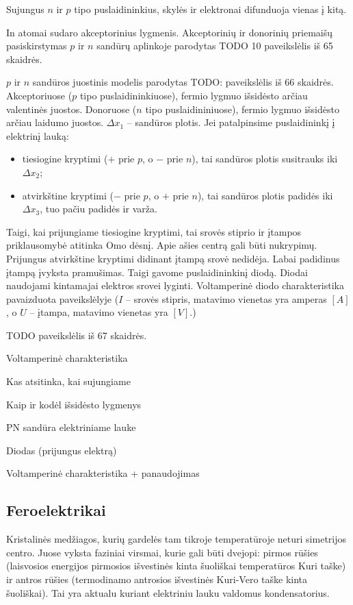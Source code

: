 Sujungus $n$ ir $p$ tipo puslaidininkius, skylės ir elektronai
difunduoja vienas į kitą.

In atomai sudaro akceptorinius lygmenis. Akceptorinių ir donorinių
priemaišų pasiskirstymas $p$ ir $n$ sandūrų aplinkoje
parodytas TODO 10 paveikslėlis iš 65 skaidrės.

$p$ ir $n$ sandūros juostinis modelis parodytas TODO: paveikslėlis
iš 66 skaidrės.
Akceptoriuose ($p$ tipo puslaidininkiuose), fermio lygmuo išsidėsto
arčiau valentinės juostos. Donoruose ($n$ tipo puslaidininiuose),
fermio lygmuo išsidėsto arčiau laidumo juostos. $\Delta x_{1}$ –
sandūros plotis. Jei patalpinsime puslaidininkį į elektrinį
lauką:
\begin{itemize}
  \item tiesiogine kryptimi ($+$ prie $p$, o $-$ prie $n$), tai
    sandūros plotis susitrauks iki $\Delta x_{2}$;
  \item atvirkštine kryptimi ($-$ prie $p$, o $+$ prie $n$),
    tai sandūros plotis padidės iki $\Delta x_{3}$, tuo pačiu
    padidės ir varža.
\end{itemize}
Taigi, kai prijungiame tiesiogine kryptimi, tai srovės stiprio ir
įtampos priklausomybė atitinka Omo dėsnį. Apie ašies centrą gali
būti nukrypimų. Prijungus atvirkštine kryptimi didinant įtampą
srovė nedidėja. Labai padidinus įtampą įvyksta pramušimas.
Taigi gavome puslaidininkinį diodą. Diodai naudojami kintamajai
elektros srovei lyginti. Voltamperinė diodo charakteristika
pavaizduota  paveikslėlyje ($I$ – srovės stipris,
matavimo vienetas yra amperas $[A]$, o $U$ – įtampa, matavimo vienetas
yra $[V]$.)

TODO paveikslėlis iš 67 skaidrės.

{Voltamperinė charakteristika}

\begin{remember}
  \item Kas atsitinka, kai sujungiame
  \item Kaip ir kodėl išsidėsto lygmenys
  \item PN sandūra elektriniame lauke
  \item Diodas (prijungus elektrą)
  \item Voltamperinė charakteristika + panaudojimas
\end{remember}

\subsection{Feroelektrikai}
Kristalinės medžiagos, kurių gardelės tam tikroje temperatūroje neturi
simetrijos centro. Juose vyksta faziniai virsmai, kurie gali būti
dvejopi: pirmos rūšies (laisvosios energijos pirmosios išvestinės
kinta šuoliškai temperatūros Kuri taške) ir antros rūšies (termodinamo
antrosios išvestinės Kuri-Vero taške kinta šuoliškai). Tai yra
aktualu kuriant elektriniu lauku valdomus kondensatorius.

